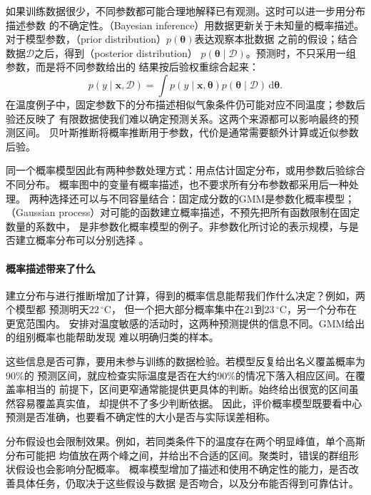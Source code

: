 如果训练数据很少，不同参数都可能合理地解释已有观测。这时可以进一步用分布描述参数
的不确定性。（Bayesian inference）用数据更新关于未知量的概率描述。
对于模型参数，（prior distribution）$p(\bm{\theta})$表达观察本批数据
之前的假设；结合数据$\mathcal{D}$之后，得到（posterior distribution）
$p(\bm{\theta}\mid\mathcal{D})$。预测时，不只采用一组参数，而是将不同参数给出的
结果按后验权重综合起来：
\begin{equation}
  p(y\mid\bm{x},\mathcal{D})
  =\int p(y\mid\bm{x},\bm{\theta})
    p(\bm{\theta}\mid\mathcal{D})\,\mathrm{d}\bm{\theta}.
  \label{eq:models-bayesian-prediction}
\end{equation}
在温度例子中，固定参数下的分布描述相似气象条件仍可能对应不同温度；参数后验还反映了
有限数据使我们难以确定预测关系。这两个来源都可以影响最终的预测区间。
贝叶斯推断将概率推断用于参数，代价是通常需要额外计算或近似参数后验。

同一个概率模型因此有两种参数处理方式：用点估计固定分布，或用参数后验综合不同分布。
概率图中的变量有概率描述，也不要求所有分布参数都采用后一种处理。
两种选择还可以与不同容量结合：固定成分数的GMM是参数化概率模型；
（Gaussian process）对可能的函数建立概率描述，不预先把所有函数限制在固定数量的系数中，
是非参数化概率模型的例子。非参数化所讨论的表示规模，与是否建立概率分布可以分别选择
。

\paragraph{概率描述带来了什么}

建立分布与进行推断增加了计算，得到的概率信息能帮我们作什么决定？例如，两个模型都
预测明天$22\,^{\circ}\mathrm{C}$，
但一个把大部分概率集中在$21$到$23\,^{\circ}\mathrm{C}$，另一个分布在更宽范围内。
安排对温度敏感的活动时，这两种预测提供的信息不同。GMM给出的组别概率也能帮助发现
难以明确归类的样本。

这些信息是否可靠，要用未参与训练的数据检验。若模型反复给出名义覆盖概率为$90\%$的
预测区间，就应检查实际温度是否在大约$90\%$的情况下落入相应区间。在覆盖率相当的
前提下，区间更窄通常能提供更具体的判断。始终给出很宽的区间虽然容易覆盖真实值，
却提供不了多少判断依据。
因此，评价概率模型既要看中心预测是否准确，也要看不确定性的大小是否与实际误差相称。

分布假设也会限制效果。例如，若同类条件下的温度存在两个明显峰值，单个高斯分布可能把
均值放在两个峰之间，并给出不合适的区间。聚类时，错误的群组形状假设也会影响分配概率。
概率模型增加了描述和使用不确定性的能力，是否改善具体任务，仍取决于这些假设与数据
是否吻合，以及分布能否得到可靠估计。

